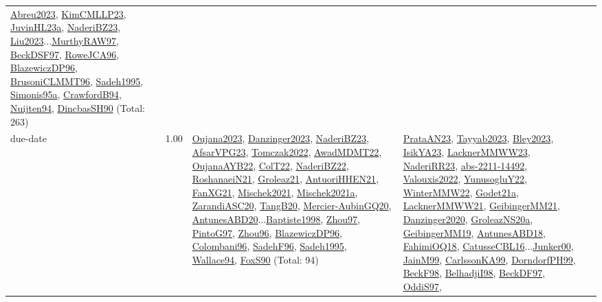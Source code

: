 {\begin{longtable}{p{3cm}r>{\raggedright\arraybackslash}p{6cm}>{\raggedright\arraybackslash}p{6cm}>{\raggedright\arraybackslash}p{8cm}}
\hyperref[detail:Abreu2023]{Abreu2023}, \hyperref[detail:KimCMLLP23]{KimCMLLP23}, \hyperref[detail:JuvinHL23a]{JuvinHL23a}, \hyperref[detail:NaderiBZ23]{NaderiBZ23}, \hyperref[detail:Liu2023]{Liu2023}...\hyperref[detail:MurthyRAW97]{MurthyRAW97}, \hyperref[detail:BeckDSF97]{BeckDSF97}, \hyperref[detail:RoweJCA96]{RoweJCA96}, \hyperref[detail:BlazewiczDP96]{BlazewiczDP96}, \hyperref[detail:BrusoniCLMMT96]{BrusoniCLMMT96}, \hyperref[detail:Sadeh1995]{Sadeh1995}, \hyperref[detail:Simonis95a]{Simonis95a}, \hyperref[detail:CrawfordB94]{CrawfordB94}, \hyperref[detail:Nuijten94]{Nuijten94}, \hyperref[detail:DincbasSH90]{DincbasSH90} (Total: 263)\\
\index{due-date}\index{Concepts!due-date}due-date &  1.00 & \hyperref[detail:Oujana2023]{Oujana2023}, \hyperref[detail:Danzinger2023]{Danzinger2023}, \hyperref[detail:NaderiBZ23]{NaderiBZ23}, \hyperref[detail:AfsarVPG23]{AfsarVPG23}, \hyperref[detail:Tomczak2022]{Tomczak2022}, \hyperref[detail:AwadMDMT22]{AwadMDMT22}, \hyperref[detail:OujanaAYB22]{OujanaAYB22}, \hyperref[detail:ColT22]{ColT22}, \hyperref[detail:NaderiBZ22]{NaderiBZ22}, \hyperref[detail:RoshanaeiN21]{RoshanaeiN21}, \hyperref[detail:Groleaz21]{Groleaz21}, \hyperref[detail:AntuoriHHEN21]{AntuoriHHEN21}, \hyperref[detail:FanXG21]{FanXG21}, \hyperref[detail:Mischek2021]{Mischek2021}, \hyperref[detail:Mischek2021a]{Mischek2021a}, \hyperref[detail:ZarandiASC20]{ZarandiASC20}, \hyperref[detail:TangB20]{TangB20}, \hyperref[detail:Mercier-AubinGQ20]{Mercier-AubinGQ20}, \hyperref[detail:AntunesABD20]{AntunesABD20}...\hyperref[detail:Baptiste1998]{Baptiste1998}, \hyperref[detail:Zhou97]{Zhou97}, \hyperref[detail:PintoG97]{PintoG97}, \hyperref[detail:Zhou96]{Zhou96}, \hyperref[detail:BlazewiczDP96]{BlazewiczDP96}, \hyperref[detail:Colombani96]{Colombani96}, \hyperref[detail:SadehF96]{SadehF96}, \hyperref[detail:Sadeh1995]{Sadeh1995}, \hyperref[detail:Wallace94]{Wallace94}, \hyperref[detail:FoxS90]{FoxS90} (Total: 94) & \hyperref[detail:PrataAN23]{PrataAN23}, \hyperref[detail:Tayyab2023]{Tayyab2023}, \hyperref[detail:Bley2023]{Bley2023}, \hyperref[detail:IsikYA23]{IsikYA23}, \hyperref[detail:LacknerMMWW23]{LacknerMMWW23}, \hyperref[detail:NaderiRR23]{NaderiRR23}, \hyperref[detail:abs-2211-14492]{abs-2211-14492}, \hyperref[detail:Valouxis2022]{Valouxis2022}, \hyperref[detail:YunusogluY22]{YunusogluY22}, \hyperref[detail:WinterMMW22]{WinterMMW22}, \hyperref[detail:Godet21a]{Godet21a}, \hyperref[detail:LacknerMMWW21]{LacknerMMWW21}, \hyperref[detail:GeibingerMM21]{GeibingerMM21}, \hyperref[detail:Danzinger2020]{Danzinger2020}, \hyperref[detail:GroleazNS20a]{GroleazNS20a}, \hyperref[detail:GeibingerMM19]{GeibingerMM19}, \hyperref[detail:AntunesABD18]{AntunesABD18}, \hyperref[detail:FahimiOQ18]{FahimiOQ18}, \hyperref[detail:CatusseCBL16]{CatusseCBL16}...\hyperref[detail:Junker00]{Junker00}, \hyperref[detail:JainM99]{JainM99}, \hyperref[detail:CarlssonKA99]{CarlssonKA99}, \hyperref[detail:DorndorfPH99]{DorndorfPH99}, \hyperref[detail:BeckF98]{BeckF98}, \hyperref[detail:BelhadjiI98]{BelhadjiI98}, \hyperref[detail:BeckDF97]{BeckDF97}, \hyperref[detail:OddiS97]{OddiS97}, 
\end{longtable}}
